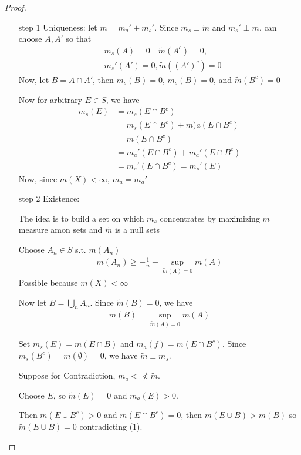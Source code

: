 \begin{proof}
	\begin{enumerate}
		\item[step 1] Uniqueness: let $m = m_{a}' + m_{s}'$.
			Since $m_{s} \perp \tilde m$ and $m_{s}' \perp \tilde m$, can choose
			$A , A'$ so that 
			\begin{align*}
				&m_s (A) = 0 \quad \tilde m (A^{c}) = 0, \\
				&m_s' (A') = 0, \tilde m ( (A')^c) = 0
			\end{align*} 
			Now, let $B = A \cap A'$, then  $m_s (B) = 0$, $m_s (B) = 0$, and $\tilde m(B^c) = 0$

			Now for arbitrary $E \in S$, we have
			\begin{align*}
				m_s (E) &= m_s ( E \cap B^c) \\
						&= m_s (E \cap B^c) + m)a (E \cap B^c) \\
						&= m (E \cap B^c) \\
						&= m_a' (E \cap B^c) + m_a' (E \cap B^c) \\
						&= m_s' (E \cap B^c) = m_s'(E)
			\end{align*} 
			Now, since $m (X) < \infty$, $m_a = m_a'$
		\item[step 2] Existence:

			The idea is to build a set on which $m_s$ concentrates by maximizing $m$ measure amon sets and $\tilde m$ is a null sets

			Choose $A_{n} \in S$ s.t. $ \tilde m (A_{n})$
			\begin{align*}
				m(A_{n}) \geq -\frac{1}{n} + \sup_{\tilde{m} (A) = 0} m(A)
			\end{align*} Possible because $m(X) < \infty$


			Now let  $B = \bigcup_{n} A_{n}$. Since $\tilde m (B) = 0$, we have
			\begin{align}
				m(B) = \sup_{\tilde m (A) = 0} m (A)
			\end{align} 

			Set $m_s (E) = m (E \cap B)$ and $m_a (f) = m (E \cap B^c)$.
			Since  $m_s (B^c) = m( \emptyset) = 0$, we have $\tilde m \perp m_s$.


			Suppose for Contradiction, $m_a < \nless \tilde m$.

			Choose $E$, so $\tilde m (E) = 0$ and $m_a (E) > 0$.

			Then $m(E \cup B^c) > 0$ and $\tilde m (E \cap B^c) = 0$, then 
			$m(E \cup B) > m (B)$
			so  $\tilde m (E \cup B) = 0$ contradicting (1).
	\end{enumerate} 
\end{proof}

